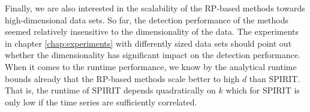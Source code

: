 Finally, we are also interested in the scalability of the RP-based methods towards high-dimensional data sets. So far, the detection performance of the methods seemed relatively insensitive to the dimensionality of the data. The experiments in chapter \ref{chap:experiments} with differently sized data sets should point out whether the dimensionality has significant impact on the detection performance. When it comes to the runtime performance, we know by the analytical runtime bounds already that the RP-based methods scale better to high $d$ than SPIRIT. That is, the runtime of SPIRIT depends quadratically on $k$ which for SPIRIT is only low if the time series are sufficiently correlated.

